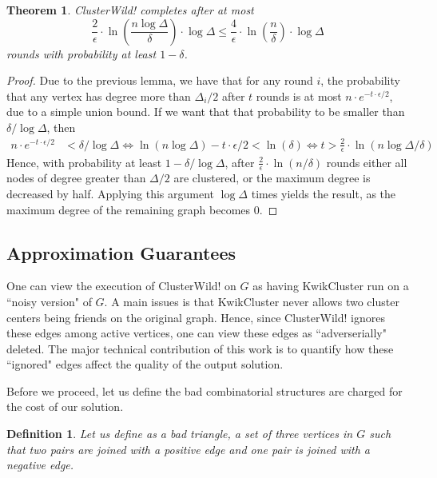 \documentclass{article} %
\newtheorem{theo}{Theorem}
\newtheorem{defin}{Definition}
\begin{document}
\begin{theo}
ClusterWild! completes after at most 
$$\frac{2}{\epsilon} \cdot \ln\left(\frac{n \log \Delta}{\delta}\right) \cdot \log \Delta
\le \frac{4}{\epsilon} \cdot \ln\left(\frac{n}{\delta}\right) \cdot \log \Delta$$ 
rounds with probability at least $1-\delta$.
\end{theo}
\begin{proof}
Due to the previous lemma, we have that for any round $i$, the probability that any vertex has degree more than $\Delta_i/2$ after $t$ rounds is at most $n\cdot e^{-t\cdot \epsilon /2}$, due to a simple union bound.
If we want that that probability to be smaller than $\delta / \log\Delta$, then
\begin{align*}
n\cdot e^{-t\cdot \epsilon /2} &< \delta / \log\Delta
\Leftrightarrow \ln (n \log \Delta) -t\cdot \epsilon /2 < \ln(\delta)
\Leftrightarrow t > \frac{2}{\epsilon}\cdot\ln(n \log \Delta / \delta)
\end{align*}
Hence, with probability at least $1-\delta / \log\Delta$, after $\frac{2}{\epsilon}\cdot\ln(n/\delta)$ rounds either all nodes of degree greater than $\Delta/2$ are clustered, or the maximum degree is decreased by half.
Applying this argument $\log\Delta$ times yields the result, as the maximum degree of the remaining graph becomes $0$.
\end{proof}




\subsection{Approximation Guarantees}
One can view the execution of ClusterWild! on $G$ as having KwikCluster run on a ``noisy version" of $G$.
A main issues is that KwikCluster never allows two cluster centers being friends on the original graph.
Hence, since ClusterWild! ignores these edges among active vertices, one can view these edges as ``adverserially" deleted.
The major technical contribution of this work is to quantify how these ``ignored" edges affect the quality of the output solution.

Before we proceed, let us define the bad combinatorial structures are charged for the cost of our solution.


\begin{defin}
Let us define as a {\it bad triangle}, a set of three vertices in $G$ such that two pairs are joined with a positive edge and one pair is joined with a negative edge. 
\end{defin}
\end{document}
